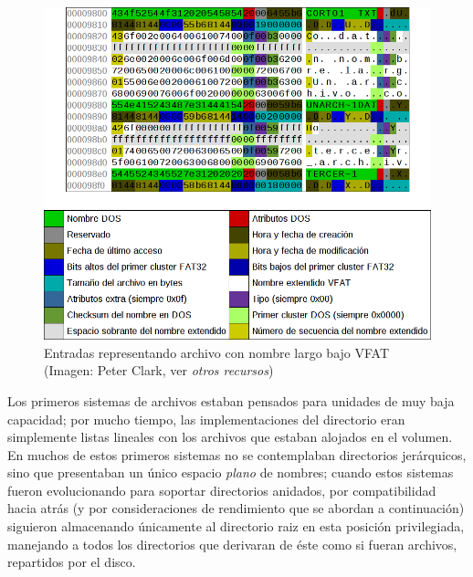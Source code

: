 \documentclass[11pt,fleqn]{book} %
\begin{document}
\begin{figure}[htb]
\centering
\includegraphics[width=\textwidth]{./img/directorio_vfat.png}
\caption{\label{FS_directorio_vfat}Entradas representando archivo con nombre largo bajo VFAT (Imagen: Peter Clark, ver \emph{otros recursos})}
\end{figure}

Los primeros sistemas de archivos estaban pensados para unidades de
muy baja capacidad; por mucho tiempo, las implementaciones del
directorio eran simplemente listas lineales con los archivos que
estaban alojados en el volumen. En muchos de estos primeros sistemas
no se contemplaban directorios jerárquicos, sino que presentaban un
único espacio \emph{plano} de nombres; cuando estos sistemas fueron
evolucionando para soportar directorios anidados, por compatibilidad
hacia atrás (y por consideraciones de rendimiento que se abordan a
continuación) siguieron almacenando únicamente al directorio raiz en
esta posición privilegiada, manejando a todos los directorios que
derivaran de éste como si fueran archivos, repartidos por el disco.
\end{document}

